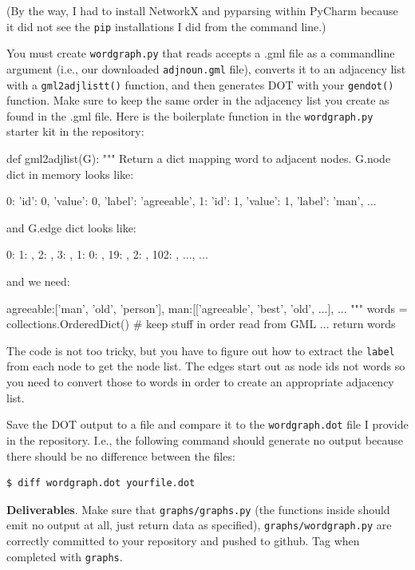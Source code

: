 \begin{fullwidth}
(By the way, I had to install NetworkX and pyparsing within PyCharm because it did not see the {\tt pip} installations I did from the command line.)

You must create {\tt wordgraph.py} that reads accepts a .gml file as a commandline argument (i.e., our downloaded {\tt adjnoun.gml} file), converts it to an adjacency list with a {\tt gml2adjlistt()} function, and then generates DOT with your {\tt gendot()} function. Make sure to keep the same order in the adjacency list you create as found in the .gml file.  Here is the boilerplate function in the {\tt wordgraph.py} starter kit in the repository:

\begin{pyverbatim}
def gml2adjlist(G):
    """
    Return a dict mapping word to adjacent nodes. G.node dict in memory
    looks like:

    {0: {'id': 0, 'value': 0, 'label': 'agreeable'},
    1: {'id': 1, 'value': 1, 'label': 'man'}, ... }

    and G.edge dict looks like:

    {0: {1: {}, 2: {}, 3: {}}, 1: {0: {}, 19: {}, 2: {}, 102: {}, ...}, ...}

    and we need:

    {agreeable:['man', 'old', 'person'], man:[['agreeable', 'best', 'old', ...], ...}
    """
    words = collections.OrderedDict()  # keep stuff in order read from GML
    ...
    return words
\end{pyverbatim}

The code is not too tricky, but you have to figure out how to extract the {\tt label} from each node to get the node list. The edges start out as node ids not words so you need to convert those to words in order to create an appropriate adjacency list.

Save the DOT output to a file and compare it to the {\tt wordgraph.dot} file I provide in the repository. I.e., the following command should generate no output because there should be no difference between the files:

\begin{lstlisting}[style=BashInputStyle]
$ diff wordgraph.dot yourfile.dot
\end{lstlisting}

\begin{callout}{\bcplume}
{\bf Deliverables}. Make sure that {\tt graphs/graphs.py} (the functions inside should emit no output at all, just return data as specified), {\tt graphs/wordgraph.py} are correctly committed to your repository and pushed to github. Tag when completed with {\tt graphs}.
\end{callout}

\end{fullwidth}
